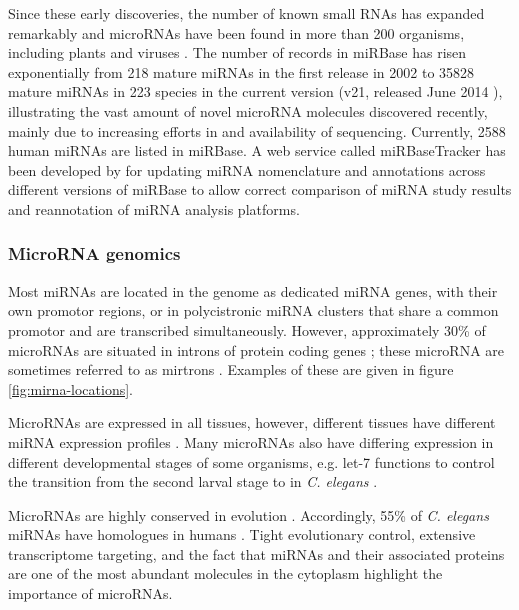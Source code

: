 Since these early discoveries, the number of known small RNAs has expanded
remarkably and microRNAs have been found in more than 200 organisms, including
plants and viruses \citep{JonesRhoades2006,TOINENERILAJEISTA,Grundhoff2011}. 
The number of records in miRBase has risen exponentially
from %
218 mature miRNAs in the first release in 2002 to %
35828 mature miRNAs in 223 species in the current version (v21,
released June 2014 \citep{VanPeer2014,MiRBaseWeb}), illustrating the vast
amount of novel microRNA molecules discovered recently, mainly due to
increasing efforts in and availability of sequencing.
Currently, 2588 human miRNAs are listed in miRBase. A web service called
miRBaseTracker has been developed by \citet{VanPeer2014} for updating
miRNA nomenclature and annotations across different versions of miRBase to
allow correct comparison of miRNA study results and reannotation of miRNA
analysis platforms.



\subsubsection{MicroRNA genomics}\label{microrna-genomics}

Most miRNAs are located in the genome as dedicated miRNA genes, with their own
promotor regions, or in polycistronic miRNA clusters that share a common
promotor and are transcribed simultaneously. However, approximately 30\%
of microRNAs are situated in introns of protein coding genes \citep{Lin2015};
these microRNA are sometimes referred to as mirtrons \citep{Ruby2007}.
Examples of these are given in figure \ref{fig:mirna-locations}.

MicroRNAs are expressed in all tissues, however, different tissues
have different miRNA expression profiles \cite{Krol2010}. Many microRNAs also
have differing expression in different developmental stages
of some organisms, e.g. let-7 functions to control the transition
from the second larval stage to in \emph{C. elegans} \citep{Pasquelli2000}.

MicroRNAs are highly conserved in evolution \citep{Bartel2004}.
Accordingly, 55\% of \emph{C. elegans} miRNAs have homologues in humans
\cite{Ibanez-Ventoso2008}. Tight evolutionary control, extensive transcriptome
targeting, and the fact that miRNAs and their associated proteins are one of
the most abundant molecules in the cytoplasm \citep{Bartel2004} highlight the
importance of microRNAs.


